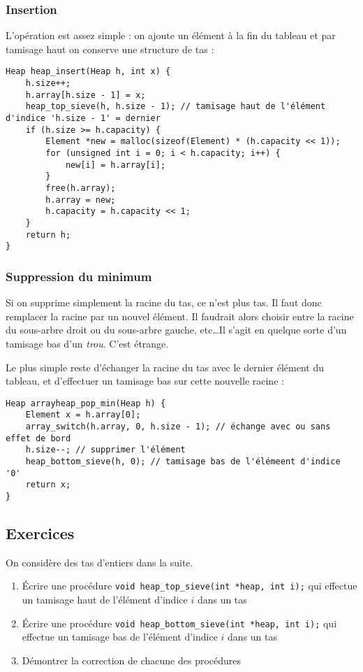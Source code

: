 \documentclass[../../../main.tex]{subfiles}
\begin{document}
\subsubsection{Insertion}
L'opération est assez simple : on ajoute un élément à la fin du tableau et par tamisage haut on conserve une structure de tas :
\begin{verbatim}
Heap heap_insert(Heap h, int x) {
	h.size++;
	h.array[h.size - 1] = x;
	heap_top_sieve(h, h.size - 1); // tamisage haut de l'élément d'indice 'h.size - 1' = dernier
	if (h.size >= h.capacity) {
		Element *new = malloc(sizeof(Element) * (h.capacity << 1));
		for (unsigned int i = 0; i < h.capacity; i++) {
			new[i] = h.array[i];
		}
		free(h.array);
		h.array = new;
		h.capacity = h.capacity << 1;
	}
	return h;
}
\end{verbatim}
\subsubsection{Suppression du minimum}
Si on supprime simplement la racine du tas, ce n'est plus tas. Il faut donc remplacer la racine par un nouvel élément. Il faudrait alors choisir entre la racine du sous-arbre droit ou du sous-arbre gauche, etc\dots Il s'agit en quelque sorte d'un tamisage bas d'un \textit{trou}. C'est étrange.

Le plus simple reste d'échanger la racine du tas avec le dernier élément du tableau, et d'effectuer un tamisage bas sur cette nouvelle racine :
\begin{verbatim}
Heap arrayheap_pop_min(Heap h) {
	Element x = h.array[0];
	array_switch(h.array, 0, h.size - 1); // échange avec ou sans effet de bord
	h.size--; // supprimer l'élément
	heap_bottom_sieve(h, 0); // tamisage bas de l'élémeent d'indice '0'
	return x;
}
\end{verbatim}
\subsection{Exercices}
 On considère des tas d'entiers dans la suite.
\begin{enumerate}
	\item Écrire une procédure \texttt{void heap_top_sieve(int *heap, int i);} qui effectue un tamisage haut de l'élément d'indice $i$ dans un tas
	\item Écrire une procédure \texttt{void heap_bottom_sieve(int *heap, int i);} qui effectue un tamisage bas de l'élément d'indice $i$ dans un tas
	\item Démontrer la correction de chacune des procédures
\end{enumerate}
\end{document}
